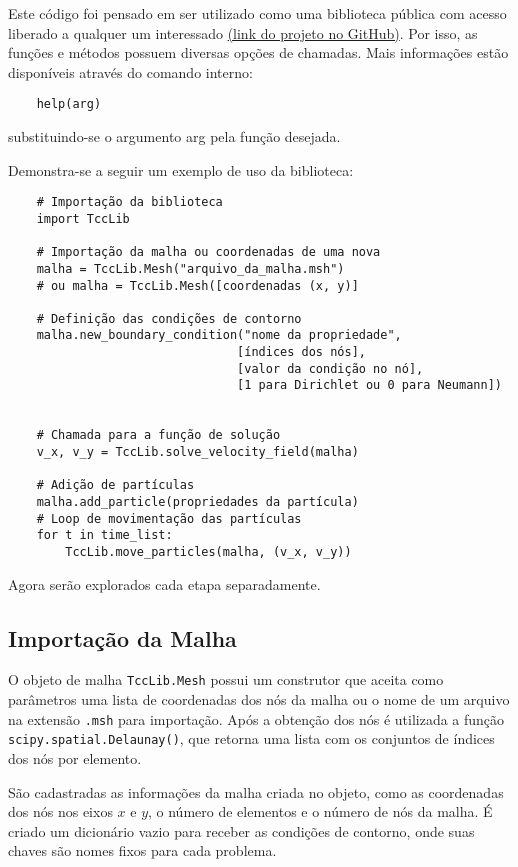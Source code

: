 Este código foi pensado em ser utilizado como uma biblioteca pública com acesso liberado a qualquer um interessado \href{https://github.com/encarvlucas/LucasCarvalhoTCC}{(link do projeto no GitHub)}.
Por isso, as funções e métodos possuem diversas opções de chamadas.
Mais informações estão disponíveis através do comando interno:
\begin{verbatim}
    help(arg)
\end{verbatim}
substituindo-se o argumento arg pela função desejada.

Demonstra-se a seguir um exemplo de uso da biblioteca:
\begin{verbatim}
    # Importação da biblioteca
    import TccLib

    # Importação da malha ou coordenadas de uma nova
    malha = TccLib.Mesh("arquivo_da_malha.msh")
    # ou malha = TccLib.Mesh([coordenadas (x, y)]

    # Definição das condições de contorno
    malha.new_boundary_condition("nome da propriedade",
                                [índices dos nós], 
                                [valor da condição no nó],
                                [1 para Dirichlet ou 0 para Neumann])


    # Chamada para a função de solução
    v_x, v_y = TccLib.solve_velocity_field(malha)

    # Adição de partículas
    malha.add_particle(propriedades da partícula)
    # Loop de movimentação das partículas
    for t in time_list:
        TccLib.move_particles(malha, (v_x, v_y))
\end{verbatim}

Agora serão explorados cada etapa separadamente.

\subsection{\textbf{Importação da Malha}}
O objeto de malha \verb|TccLib.Mesh| possui um construtor que aceita como parâmetros uma lista de coordenadas dos nós da malha ou o nome de um arquivo na extensão \verb|.msh| para importação.
Após a obtenção dos nós é utilizada a função \verb|scipy.spatial.Delaunay()|, que retorna uma lista com os conjuntos de índices dos nós por elemento.

São cadastradas as informações da malha criada no objeto, como as coordenadas dos nós nos eixos $x$ e $y$, o número de elementos e o número de nós da malha.
É criado um dicionário vazio para receber as condições de contorno, onde suas chaves são nomes fixos para cada problema.


